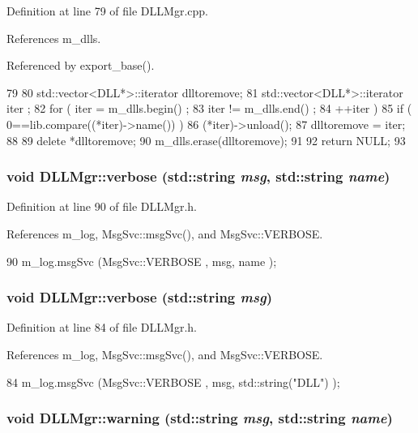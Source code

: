 Definition at line 79 of file DLLMgr.cpp.

References m\_\-dlls.

Referenced by export\_\-base().


\begin{DoxyCode}
79                                           {
80   std::vector<DLL*>::iterator dlltoremove;
81   std::vector<DLL*>::iterator iter ;
82   for ( iter = m_dlls.begin() ; 
83         iter != m_dlls.end()  ; 
84         ++iter ) {
85     if ( 0==lib.compare((*iter)->name()) ) {
86       (*iter)->unload();
87       dlltoremove = iter;
88     }
89     delete *dlltoremove;
90     m_dlls.erase(dlltoremove);
91   }
92   return NULL;
93 }
\end{DoxyCode}
\hypertarget{classDLLMgr_a7a7c039320f83aac50f315ed608d67e3}{
\subsubsection[{verbose}]{\setlength{\rightskip}{0pt plus 5cm}void DLLMgr::verbose (std::string {\em msg}, \/  std::string {\em name})}}
\label{classDLLMgr_a7a7c039320f83aac50f315ed608d67e3}


Definition at line 90 of file DLLMgr.h.

References m\_\-log, MsgSvc::msgSvc(), and MsgSvc::VERBOSE.


\begin{DoxyCode}
90 { m_log.msgSvc (MsgSvc::VERBOSE  , msg, name ); }
\end{DoxyCode}
\hypertarget{classDLLMgr_a47c406fbca0df2aaa8569e0e99927d32}{
\subsubsection[{verbose}]{\setlength{\rightskip}{0pt plus 5cm}void DLLMgr::verbose (std::string {\em msg})}}
\label{classDLLMgr_a47c406fbca0df2aaa8569e0e99927d32}


Definition at line 84 of file DLLMgr.h.

References m\_\-log, MsgSvc::msgSvc(), and MsgSvc::VERBOSE.


\begin{DoxyCode}
84 { m_log.msgSvc (MsgSvc::VERBOSE , msg, std::string("DLL") ); }
\end{DoxyCode}
\hypertarget{classDLLMgr_a84fc9787ced567adb5695fc1d7c275b8}{
\subsubsection[{warning}]{\setlength{\rightskip}{0pt plus 5cm}void DLLMgr::warning (std::string {\em msg}, \/  std::string {\em name})}}
\label{classDLLMgr_a84fc9787ced567adb5695fc1d7c275b8}



